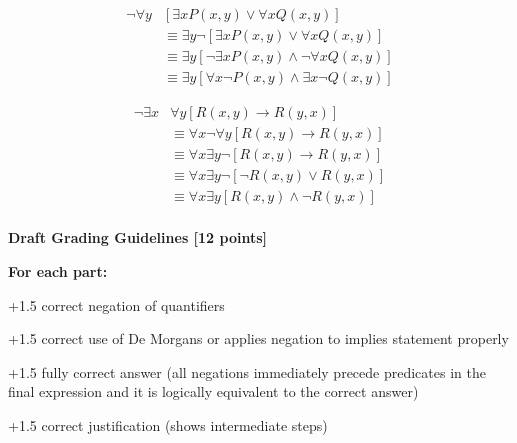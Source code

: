 \documentclass[12pt]{exam}
\begin{document}
\begin{solution}
\begin{qparts}
    \item
        \begin{align*}
            \neg \forall y & [ \exists x P(x,y) \vee \forall x Q(x, y) ] \\
            &\equiv \exists y \neg [ \exists x P(x,y) \vee \forall x Q(x, y) ] \\
            &\equiv \exists y [\neg \exists x P(x,y) \wedge \neg \forall x Q(x,y)] \\
            &\equiv \exists y [\forall x \neg P(x,y) \wedge \exists x \neg  Q(x,y)] 
        \end{align*}
    \item 
        \begin{align*}
            \neg \exists x & \forall y [ R(x,y) \rightarrow R(y, x) ] \\
            &\equiv \forall x \neg \forall y [ R(x,y) \rightarrow R(y, x) ] \\
            &\equiv \forall x \exists y \neg [ R(x,y) \rightarrow R(y, x) ] \\
            &\equiv \forall x \exists  y \neg [\neg R(x,y) \vee R(y, x) ] \\
            &\equiv \forall x \exists  y [ R(x,y) \wedge \neg R(y, x) ] \\
        \end{align*}
\end{qparts}
\textbf{Draft Grading Guidelines [12 points]}

\textbf{For each part:}
\begin{guidelines}
    \item +1.5 correct negation of quantifiers
    \item +1.5 correct use of De Morgans or applies negation to implies statement properly
    \item +1.5 fully correct answer (all negations immediately precede predicates in the final expression and it is logically equivalent to the correct answer)
    \item +1.5 correct justification (shows intermediate steps)
\end{guidelines}
\end{solution}
\end{document}
